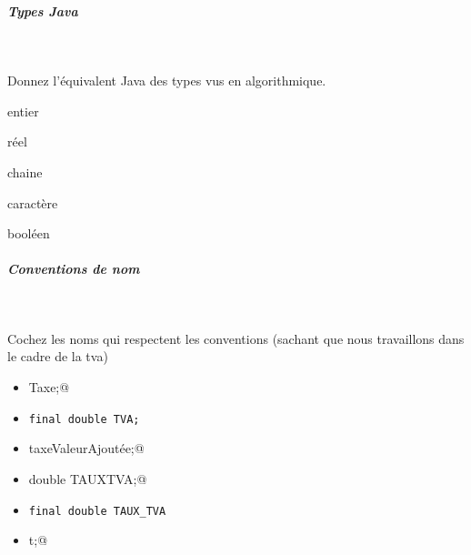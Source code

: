 \documentclass[11pt,a4paper]{article}
\begin{document}
			
		\subparagraph{Types Java} 
		
                \textcolor{white}{.} \par
            
                  Donnez l'\'equivalent Java des types vus en algorithmique. 
                
            \par
         
                entier 		 \textcolor{gray}{\underline{\hspace*{2em}}} \par
				
                r\'eel   		 \textcolor{gray}{\underline{\hspace*{5em}}} \par
				
                chaine 		 \textcolor{gray}{\underline{\hspace*{5em}}} \par
				
                caract\`ere	 \textcolor{gray}{\underline{\hspace*{3em}}} \par
				
                bool\'een      \textcolor{gray}{\underline{\hspace*{5em}}} \par
				
			
		\subparagraph{Conventions de nom} 
		
                \textcolor{white}{.} \par
            Cochez les noms qui respectent les conventions (sachant que nous travaillons dans le cadre de la tva)
            \begin{itemize} 
        
            \item[ \ding{"6F} ] \verb@double Taxe;@
        
            \item[ \ding{"6F} ] \verb|final double TVA;|
        
            \item[ \ding{"6F} ] \verb@double taxeValeurAjoutée;@
        
            \item[ \ding{"6F} ] \verb@final double TAUXTVA;@
        
            \item[ \ding{"6F} ] \verb|final double TAUX_TVA|
        
            \item[ \ding{"6F} ] \verb@double t;@
        
            \end{itemize} 
        
\end{document}
